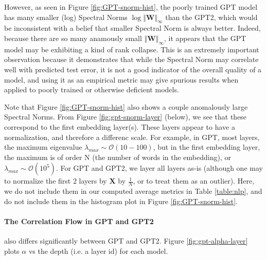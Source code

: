 However, as seen in Figure \ref{fig:GPT-snorm-hist},
 the poorly trained GPT model has many smaller (log) Spectral Norms $\log\Vert\mathbf{W}\Vert_{\infty}$
than the GPT2, which would be inconsistent with a belief that smaller Spectral Norm is always better.
Indeed, because there are so many anamously small $\Vert\mathbf{W}\Vert_{\infty}$,
it appears that the GPT model may be exhibiting a kind of rank collapse.
This is an extremely important observation because it demonstrates that while the Spectral Norm
may correlate well with predicted test error, it is not a good indicator of the overall quality of a model,
and using it as an empirical metric may give spurious results when applied to poorly trained
or otherwise deficient models.  


Note that Figure \ref{fig:GPT-snorm-hist} also shows a couple anomalously  large Spectral Norms.
From Figure \ref{fig:gpt-snorm-layer} (below), we see that these correspond to the first embedding layer(s).
These layers appear to have a normalization, and therefore a differenc scale.
For example, in GPT, most layers, the maximum eigenvalue $\lambda_{max}\sim\mathcal{O}(10-100)$,
but in the first embedding layer, the maximum is of order N (the number of words in the embedding), or
 $\lambda_{max}\sim\mathcal{O}(10^{5})$.  For GPT and GPT2, we layer all layers as-is (although one may to normalize
the first 2 layers by  $\mathbf{X}$ by $\frac{1}{N}$, or to treat them as an outlier).
Here, we do not include them in our computed average metrics in Table \ref{table:nlp},
and do not include them in the histogram plot in Figure \ref{fig:GPT-snorm-hist}.


\paragraph{The Correlation Flow in GPT and GPT2} also differs significantly between GPT and GPT2.
Figure \ref{fig:gpt-alpha-layer} plots $\alpha$ vs the depth (i.e. a layer id) for each model.


